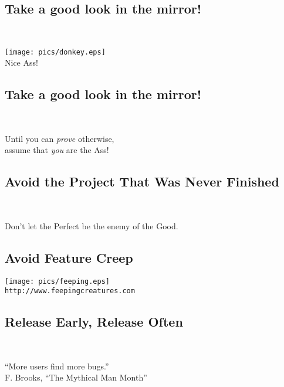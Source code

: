 \documentclass[xga]{xdvislides}
\begin{document}
\subsection{Take a good look in the mirror!}
\\
\vspace*{\fill}
\begin{center}
	\texttt{[image: pics/donkey.eps]} \\
	\small
	Nice Ass!
\end{center}
\vspace*{\fill}

\subsection{Take a good look in the mirror!}
\\
\Huge
\begin{center}
	Until you can {\em prove} otherwise, \\
	assume that {\em you} are the Ass!
\end{center}
\Normalsize

\subsection{Avoid the Project That Was Never Finished}
\\
\Huge
\begin{center}
	Don't let the Perfect be the enemy of the Good.
\end{center}
\Normalsize

\subsection{Avoid Feature Creep}
\vspace*{\fill}
\begin{center}
	\texttt{[image: pics/feeping.eps]} \\
	\small
	\verb+http://www.feepingcreatures.com+
\end{center}
\vspace*{\fill}

\subsection{Release Early, Release Often}
\\
\Huge
\begin{center}
	``More users find more bugs.'' \\
	\addvspace{.2in}
	\small F. Brooks, ``The Mythical Man Month''
\end{center}
\Normalsize
\end{document}
